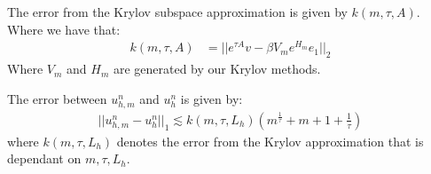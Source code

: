 \begin{definition}
    The error from the Krylov subspace approximation is given by $k(m,\tau, A)$.
    Where we have that:
    \begin{align*}
        k(m,\tau, A) &= ||e^{\tau A}v - \beta V_m e^{H_m}e_1||_2
    \end{align*}
    Where $V_m$ and $H_m$ are generated by our Krylov methods.
\end{definition}
\begin{lemma}
    The error between $u_{h,m}^n$ and $u_{h}^n$ is given by:
    \begin{align*}
        ||u_{h,m}^n - u_{h}^n||_1 \lesssim k(m,\tau, L_h)(m^\frac{1}{\tau} + m + 1 + \frac{1}{\tau})
    \end{align*}
    where $k(m,\tau,L_h)$ denotes the error from the Krylov approximation that is dependant on $m, \tau, L_h$.
\end{lemma}
